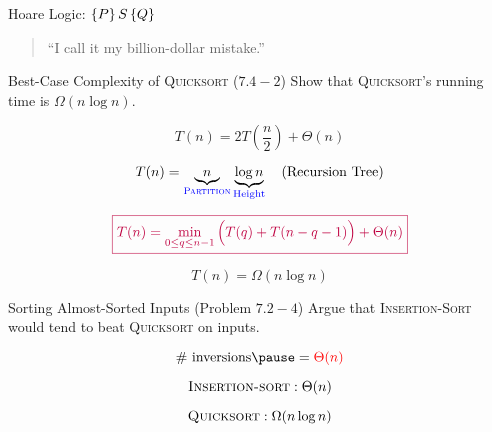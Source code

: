 
\begin{frame}{}
  \centerline{}

  \pause
  \begin{center}
    Hoare Logic: $\left\{P\right\} S \left\{Q\right\}$  \pause \\[4pt]
    \texttt{}
  \end{center}

  \pause
  \begin{quote}
    \centering
    ``I call it my billion-dollar mistake.''
  \end{quote}
\end{frame}

\begin{frame}{}
  \begin{exampleblock}{Best-Case Complexity of \textsc{Quicksort} ($7.4-2$)}
    Show that \textsc{Quicksort}'s  running time is $\Omega(n \log n)$.
  \end{exampleblock}

  \pause
  \[
    T(n) = 2T(\frac{n}{2}) + \Theta(n)
  \]

  \pause
  \[
    T(n) = \underbrace{n}_{\textsc{\textcolor{blue}{Partition}}} \underbrace{\log n}_{\text{\textcolor{blue}{Height}}} \quad \text{(Recursion Tree)}
  \]

  \pause
  \vspace{0.30cm}
  \[
    \textcolor{purple}{\boxed{T(n) = \min_{0 \le q \le n-1} \Big( T(q) + T(n-q-1) \Big) + \Theta(n)}}
  \]

  \pause
  \[
    T(n) = \Omega(n \log n)
  \]

  \pause
  \centerline{}
\end{frame}

\begin{frame}{}
  \begin{exampleblock}{Sorting Almost-Sorted Inputs (Problem $7.2-4$)}
    Argue that \textsc{Insertion-Sort} would tend to beat \textsc{Quicksort} on  inputs.
  \end{exampleblock}

  \pause
  \[
    \# \text{ inversions} \pause = \red{\Theta(n)}
  \]

  \pause
  \[
    \textsc{Insertion-sort}: \Theta(n) 
  \]

  \pause
  \[
    \textsc{Quicksort}: \Omega(n \log n)
  \]
\end{frame}

